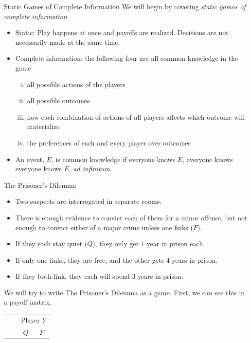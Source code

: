 \documentclass[8pt]{extarticle}
\begin{document}
  \begin{problem}{Static Games of Complete Information}
    We will begin by covering \textit{static games of complete information}.
    \begin{itemize}
      \item Static: Play happens at once and payoffs are realized. Decisions are not necessarily made at the same time.
      \item Complete information: the following four are all common knowledge in the game
        \begin{enumerate}[(i)]
          \item all possible actions of the players
          \item all possible outcomes
          \item how each combination of actions of all players affects which outcome will materialize
          \item the preferences of each and every player over outcomes
        \end{enumerate}
      \item An event, $E$, is common knowledge if everyone knows $E$, everyone knows everyone knows $E$, \textit{ad infinitum}.
    \end{itemize}
    \begin{problem}{The Prisoner's Dilemma}
      \begin{itemize}
        \item Two suspects are interrogated in separate rooms.
        \item There is enough evidence to convict each of them for a minor offense, but not enough to convict either of a major crime unless one finks ($F$).
        \item If they each stay quiet ($Q$), they only get $1$ year in prison each.
        \item If only one finks, they are free, and the other gets $4$ years in prison.
        \item If they both fink, they each will spend $3$ years in prison.
      \end{itemize}
      We will try to write The Prisoner's Dilemma as a game. First, we can see this in a payoff matrix.
      \begin{center}
        \renewcommand{\arraystretch}{1.25}
        \begin{tabular}{cc|c|c|}
          & \multicolumn{1}{c}{} & \multicolumn{2}{c}{Player $Y$}\\
          & \multicolumn{1}{c}{} & \multicolumn{1}{c}{$Q$}  & \multicolumn{1}{c}{$F$} \\\cline{3-4}

\end{tabular}
\end{center}
\end{problem}
\end{problem}
\end{document}
